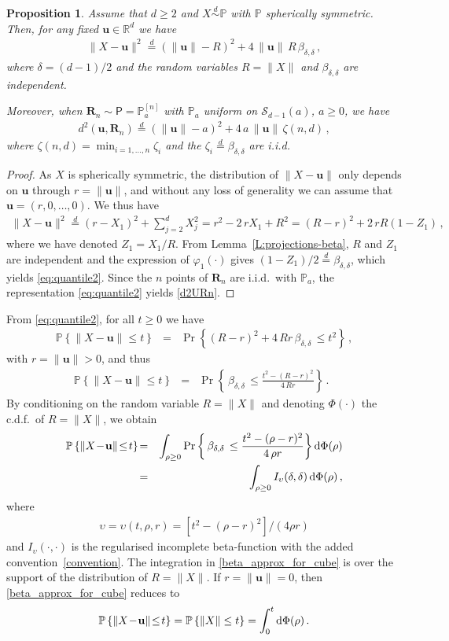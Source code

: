 \documentclass{article}
\def\Px{\mathsf{P}}
\def\eqd{\stackrel{{d}}{=}}
\def\RR{\mathds{R}}
\def\simd{\stackrel{d}{\sim}}
\def\PP{\mathbb{P}}
\def\SS{{\mathcal S}}
\newcommand{\bea}{\begin{eqnarray*}}
\newcommand{\eea}{\end{eqnarray*}}
\newcommand{\be}{\begin{eqnarray}}
\newcommand{\ee}{\end{eqnarray}}
\def\Rb{\mathbf{R}}
\def\ub{\mathbf{u}}
\def\dd{\mbox{\rm d}}
\newtheorem{proposition}{Proposition}[section]
\begin{document}
\begin{proposition} \label{th:dist}
Assume that $d\geq 2$ and $X\simd\PP$ with $\PP$ spherically symmetric. Then, for any fixed $\ub \in \RR^d$ we have
\be
 \|X  - \ub \|^2 \eqd (\|\ub\|-R)^2 +4\,\|\ub\|\,R \, \beta_{\delta,\delta}\, , \label{eq:quantile2}
\ee
where $\delta=(d-1)/2$ and the random variables $R=\|X \|$ and $\beta_{\delta,\delta}$ are independent.

Moreover, when $\Rb_n\sim \Px=\PP_a^{[n]}$ with $\PP_a$ uniform on $\SS_{d-1}(a)$, $a\geq 0$, we have
\be\label{d2URn}
d^2(\ub,\Rb_n)\eqd (\|\ub\|-a)^2+4\,a\,\|\ub\|\,\zeta(n,d)\,,
\ee
where $\zeta(n,d)=\min_{i=1,\ldots,n} \zeta_i$ and the $\zeta_i\eqd \beta_{\delta,\delta}$ are i.i.d.
\end{proposition}

\begin{proof}
As $X$ is spherically symmetric, the distribution of $\|X  - \ub \| $ only depends on $\ub $ through $r=\|\ub\|$, and without any loss of generality we can assume that $\ub=(r,0, \ldots, 0)$. We thus have
\bea %
 \|X \!-\! \ub \|^2
\eqd  (r\!-\!X_1)^2\!+\! \sum_{j=2}^d X_j^2 =  r^2\! -\! 2\,r X_1\!  +\!R^2= (R\!-\!r)^2 \!+\!2\,rR(1\!-\!Z_1)\,, \nonumber
\eea
where we have denoted $Z_1=X_1/R$. From Lemma~\ref{L:projections-beta}, $R$ and $Z_1$ are independent and the expression of $\varphi_1(\cdot)$ gives  $(1-Z_1)/2 \eqd  \beta_{\delta,\delta}$, which yields \eqref{eq:quantile2}.
%
Since the $n$ points of $\Rb_n$ are i.i.d.\ with $\PP_a$, the representation \eqref{eq:quantile2} yields \eqref{d2URn}.
\end{proof}

From \eqref{eq:quantile2},  for all $ t\geq 0$ we have
\bea
\PP \left\{ \| X \!-\!\ub \|\! \leq \! { t } \right\}\!&=&  \! \Pr  \left\{(R-r)^2 +4\,Rr \, \beta_{\delta,\delta}\,  \leq  { t ^2} \right\}  \,,
\eea
with $r=\|\ub\| > 0$, and thus
\bea
 \PP  \left\{ \| X \!-\!\ub \|\! \leq \! { t } \right\}&=&\Pr  \left\{\, \beta_{\delta,\delta}\,  \leq  \frac{t^2 -(R-r)^2 }{4\,Rr}  \right\}\,. \;\;
\eea
By conditioning on the random variable $R= \|X \|$ and denoting $\Phi(\cdot )$ the c.d.f.\ of $R=\|X \|$, we obtain
\be\label{beta_approx_for_cube}
\PP  \left\{ \| X \!-\!\ub \|\! \leq \! { t } \right\}\!&=& \int_{\rho\geq 0}
\Pr  \left\{\, \beta_{\delta,\delta}\,  \leq  \frac{t^2 -(\rho-r)^2 }{4\,\rho r}  \right\} \dd\Phi(\rho )  \nonumber \\
&=& \int_{\rho\geq 0} I_\upsilon(\delta,\delta) \,\dd\Phi(\rho ) \,,
\ee
where
\be\label{v}
\upsilon=\upsilon(t,\rho,r)=[t^2 -(\rho-r)^2]/(4 \rho r)
\ee
and $I_\upsilon(\cdot,\cdot )$ is the regularised incomplete beta-function with the added convention~\eqref{convention}.
The integration in \eqref{beta_approx_for_cube} is over the support of the distribution of $R=\|X \|$.
If $r=\|\ub\| = 0$, then \eqref{beta_approx_for_cube} reduces to
\bea
    \PP  \left\{ \| X\!-\!\ub \|\! \leq \! { t } \right\} = \PP  \left\{\|X\| \leq t \right\} = \int_{0}^{{t}} \dd\Phi(\rho) \,.
\eea
\end{document}

